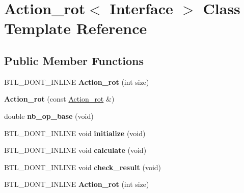 \hypertarget{class_action__rot}{}\section{Action\+\_\+rot$<$ Interface $>$ Class Template Reference}
\label{class_action__rot}
\subsection*{Public Member Functions}
\begin{DoxyCompactItemize}
\item 
\mbox{\label{class_action__rot_ac94af52cbbe33467d0d4bd08fe76ec7b}} 
B\+T\+L\+\_\+\+D\+O\+N\+T\+\_\+\+I\+N\+L\+I\+NE {\bfseries Action\+\_\+rot} (int size)
\item 
\mbox{\label{class_action__rot_a272c6c1efe34cf305f92fc685a269a22}} 
{\bfseries Action\+\_\+rot} (const \hyperlink{class_action__rot}{Action\+\_\+rot} \&)
\item 
\mbox{\label{class_action__rot_a17f86cf6ad09fdc2701e4ca215fcc27d}} 
double {\bfseries nb\+\_\+op\+\_\+base} (void)
\item 
\mbox{\label{class_action__rot_a51d899481ebaafc5c2c3ad923e5e6695}} 
B\+T\+L\+\_\+\+D\+O\+N\+T\+\_\+\+I\+N\+L\+I\+NE void {\bfseries initialize} (void)
\item 
\mbox{\label{class_action__rot_a130ab382c7d1650a0e89323ed439eb50}} 
B\+T\+L\+\_\+\+D\+O\+N\+T\+\_\+\+I\+N\+L\+I\+NE void {\bfseries calculate} (void)
\item 
\mbox{\label{class_action__rot_a8a80274cba6628f68146e5eae0544c54}} 
B\+T\+L\+\_\+\+D\+O\+N\+T\+\_\+\+I\+N\+L\+I\+NE void {\bfseries check\+\_\+result} (void)
\item 
\mbox{\label{class_action__rot_ac94af52cbbe33467d0d4bd08fe76ec7b}} 
B\+T\+L\+\_\+\+D\+O\+N\+T\+\_\+\+I\+N\+L\+I\+NE {\bfseries Action\+\_\+rot} (int size)
\item 
\mbox{\label{class_action__rot_a272c6c1efe34cf305f92fc685a269a22}} 

\end{DoxyCompactItemize}
